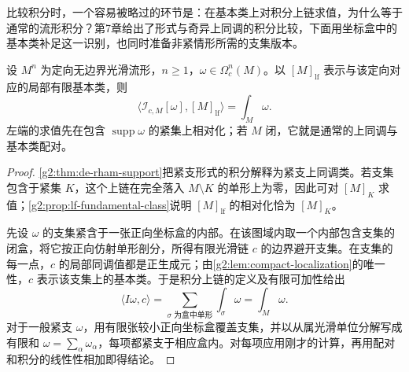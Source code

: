 \ProseParagraphBreak

比较积分时，一个容易被略过的环节是：在基本类上对积分上链求值，为什么等于通常的流形积分？第7章给出了形式与奇异上同调的积分比较，下面用坐标盒中的基本类补足这一识别，也同时准备非紧情形所需的支集版本。

\begin{lemma}\label{g2:lem:integration-fundamental-pairing}
	设 \(M^n\) 为定向无边界光滑流形，\(n\ge1\)，\(\omega\in\Omega_c^n(M)\)。以 \([M]_{\mathrm{lf}}\) 表示与该定向对应的局部有限基本类，则
	\[
		\bigl\langle\mathcal I_{c,M}[\omega],[M]_{\mathrm{lf}}\bigr\rangle
		=\int_M\omega.
	\]
	左端的求值先在包含 \(\operatorname{supp}\omega\) 的紧集上相对化；若 \(M\) 闭，它就是通常的上同调与基本类配对。
\end{lemma}
\begin{proof}
	\cref{g2:thm:de-rham-support}把紧支形式的积分解释为紧支上同调类。若支集包含于紧集 \(K\)，这个上链在完全落入 \(M\setminus K\) 的单形上为零，因此可对 \([M]_K\) 求值；\cref{g2:prop:lf-fundamental-class}说明 \([M]_{\mathrm{lf}}\) 的相对化恰为 \([M]_K\)。

	先设 \(\omega\) 的支集紧含于一张正向坐标盒的内部。在该图域内取一个内部包含支集的闭盒，将它按正向仿射单形剖分，所得有限光滑链 \(c\) 的边界避开支集。在支集的每一点，\(c\) 的局部同调值都是正生成元；由\cref{g2:lem:compact-localization}的唯一性，\(c\) 表示该支集上的基本类。于是积分上链的定义及有限可加性给出
	\[
		\langle I\omega,c\rangle=\sum_{\sigma\text{ 为盒中单形}}\int_\sigma\omega
		=\int_M\omega.
	\]
	对于一般紧支 \(\omega\)，用有限张较小正向坐标盒覆盖支集，并以从属光滑单位分解写成有限和 \(\omega=\sum_\alpha\omega_\alpha\)，每项都紧支于相应盒内。对每项应用刚才的计算，再用配对和积分的线性性相加即得结论。
\end{proof}

